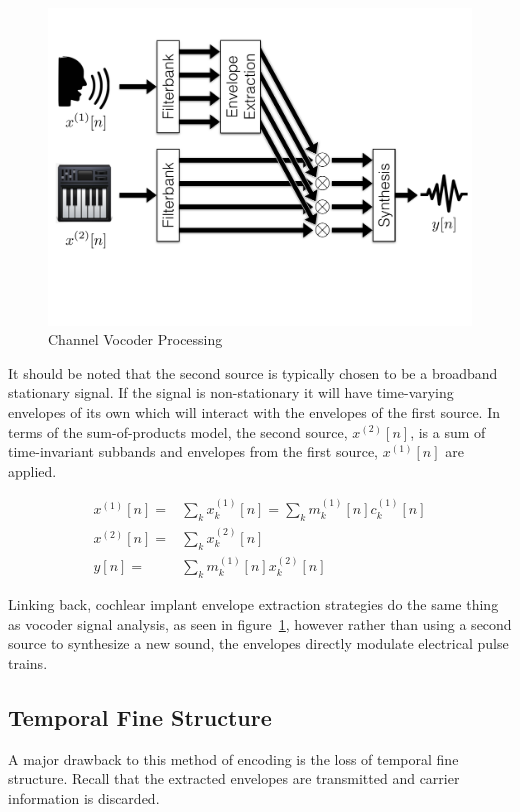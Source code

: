 \documentclass [11pt, proquest,oneside] {ganter_thesis}[2015/03/03]
\begin{document}
\begin{figure}[!ht]
  \centering
    \includegraphics[width=.75\textwidth]{vocoder}   
    \caption{Channel Vocoder Processing}\label{fig:vocoder}
\end{figure}

It should be noted that the second source is typically chosen to be a broadband stationary signal.  If the signal is non-stationary it will have time-varying envelopes of its own which will interact with the envelopes of the first source. In terms of the sum-of-products model, the second source, $x^{(2)}[n]$, is a sum of time-invariant subbands and envelopes from the first source, $x^{(1)}[n]$ are applied.

\begin{align}
\label{eq:sum-of-products}
x^{(1)}[n] =& \sum\limits_k x_k^{(1)}[n] = \sum\limits_k m^{(1)}_k[n] c^{(1)}_k[n] \\
x^{(2)}[n] =& \sum\limits_k x_k^{(2)}[n] \\
y[n] =& \sum\limits_k m_k^{(1)}[n] x_k^{(2)}[n]
\end{align}

Linking back, cochlear implant envelope extraction strategies do the same thing as vocoder signal analysis, as seen in figure~\ref{fig:vocoder}, however rather than using a second source to synthesize a new sound, the envelopes directly modulate electrical pulse trains.

\subsection{Temporal Fine Structure}

A major drawback to this method of encoding is the loss of temporal fine structure.  Recall that the extracted envelopes are transmitted and carrier information is discarded.
\end{document}

